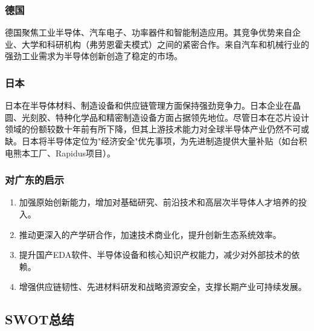 \documentclass[12pt,a4paper]{article}
\begin{document}
\subsubsection{德国}

德国聚焦工业半导体、汽车电子、功率器件和智能制造应用。其竞争优势来自企业、大学和科研机构（弗劳恩霍夫模式）之间的紧密合作。来自汽车和机械行业的强劲工业需求为半导体创新创造了稳定的市场。

\subsubsection{日本}

日本在半导体材料、制造设备和供应链管理方面保持强劲竞争力。日本企业在晶圆、光刻胶、特种化学品和精密制造设备方面占据领先地位。尽管日本在芯片设计领域的份额较数十年前有所下降，但其上游技术能力对全球半导体产业仍然不可或缺。日本将半导体定位为"经济安全"优先事项，为先进制造提供大量补贴（如台积电熊本工厂、Rapidus项目）。

\subsubsection{对广东的启示}

\begin{enumerate}[label=(\arabic*)]
    \item 加强原始创新能力，增加对基础研究、前沿技术和高层次半导体人才培养的投入。
    \item 推动更深入的产学研合作，加速技术商业化，提升创新生态系统效率。
    \item 提升国产EDA软件、半导体设备和核心知识产权能力，减少对外部技术的依赖。
    \item 增强供应链韧性、先进材料研发和战略资源安全，支撑长期产业可持续发展。
\end{enumerate}

\subsection{SWOT总结}
\label{sec:swot}
\end{document}
